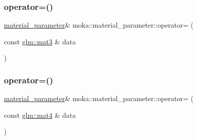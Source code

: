 \mbox{\label{structmoka_1_1material__parameter_adc1632af06d40d83c0c3261f7ed2bc6d}} 
\subsubsection{\texorpdfstring{operator=()}{operator=()}\hspace{0.1cm}{\footnotesize\ttfamily [17/26]}}
{\footnotesize\ttfamily \mbox{\hyperlink{structmoka_1_1material__parameter}{material\+\_\+parameter}}\& moka\+::material\+\_\+parameter\+::operator= (\begin{DoxyParamCaption}\item[{const \mbox{\hyperlink{namespacemoka_aed2224bc0e5b79e57a8975ded94ee1aaa0dd87e9dfdea657e8be233b5836821d0}{glm\+::mat3}} \&}]{data }\end{DoxyParamCaption})}

\mbox{\label{structmoka_1_1material__parameter_a5f89efbb35c0f23054676b97fc2ffa5d}} 
\subsubsection{\texorpdfstring{operator=()}{operator=()}\hspace{0.1cm}{\footnotesize\ttfamily [18/26]}}
{\footnotesize\ttfamily \mbox{\hyperlink{structmoka_1_1material__parameter}{material\+\_\+parameter}}\& moka\+::material\+\_\+parameter\+::operator= (\begin{DoxyParamCaption}\item[{const \mbox{\hyperlink{namespacemoka_aed2224bc0e5b79e57a8975ded94ee1aaabe14b41eb96410ea28b32bc138d885ae}{glm\+::mat4}} \&}]{data }\end{DoxyParamCaption})}

\mbox{\label{structmoka_1_1material__parameter_abcb28e88f4ccf14bd665bcf376420f97}} 
